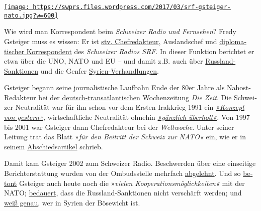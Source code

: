 \href{https://swprs.org/2017/03/01/der-korrespondent/}{\texttt{[image: https://swprs.files.wordpress.com/2017/03/srf-gsteiger-nato.jpg?w=600]}}

Wie wird man Kor­res­pon­dent beim \emph{Schwei­zer Radio und
Fern­sehen}? Fredy Gsteiger muss es wissen: Er ist
\href{http://www.persoenlich.com/medien/fredy-gsteiger-neu-in-der-radio-chefredaktion-232921}{stv.
Chef­redakteur}, Auslands­chef und
\href{http://www.srf.ch/radio-srf-1/radio-srf-1/fredy-gsteiger-unser-mann-in-der-uno}{diplo­ma­tischer
Korres­pon­dent} des \emph{Schwei­zer Radios SRF}. In dieser Funktion
be­richtet er etwa über die UNO, NATO und EU -- und damit z.B. auch über
\href{http://www.srf.ch/news/international/dieser-eu-rueckzieher-ist-peinlich}{Russ­land-Sanktionen}
und die Genfer
\href{http://www.srf.ch/news/international/assad-kommt-mit-giftgaseinsaetzen-vorlaeufig-davon}{Syrien-Ver­hand­lungen}.

Gsteiger begann seine journa­lis­tische Lauf­bahn Ende der 80er Jahre
als Nahost-Redakteur bei der
\href{https://swprs.org/netzwerk-medien-deutschland/}{deutsch-trans­atlan­tischen}
Wochen­zeitung \emph{Die Zeit}. Die Schwei­zer Neutra­lität war für ihn
schon vor dem Ersten Irak­krieg 1991 ein
\emph{\href{http://www.zeit.de/1990/44/ein-konzept-von-gestern}{»Konzept
von gestern«},} wirt­schaft­liche Neutralität ohnehin
\emph{\href{http://www.zeit.de/1990/44/ein-konzept-von-gestern}{»gänz­lich
über­holt«}.} Von 1997 bis 2001 war Gsteiger dann Chef­redakteur bei der
\emph{Welt­woche}. Unter seiner Leitung trat das Blatt »\emph{für den
Bei­tritt der Schweiz zur NATO«} ein, wie er in seinem
\href{https://web.archive.org/web/20040722094101/http://www.weltwoche.ch/artikel/?AssetID=400\&CategoryID=60}{Abschieds­artikel}
schrieb.

Damit kam Gsteiger 2002 zum Schweizer Radio. Be­schwer­den über eine
ein­sei­tige Be­richt­er­stattung wurden von der Ombuds­stelle mehr­fach
\href{https://www.srgd.ch/de/aktuelles/news/2016/09/28/sendung-info-3-auf-radio-srf-3-uber-waffenruhe-syrien-beanstandet/}{abge­lehnt}.
Und so
\href{http://www.swissinfo.ch/ger/kooperation_die-nato-umwirbt-die-schweiz/42225918}{be­tont}
Gsteiger auch heute noch die »\emph{vielen
Koope­ra­tions­möglich­keiten«} mit der NATO;
\href{http://www.srf.ch/news/international/dieser-eu-rueckzieher-ist-peinlich}{be­dauert},
dass die Russ­land-Sanktionen nicht ver­schärft werden; und
\href{http://www.srf.ch/news/international/assad-kommt-mit-giftgaseinsaetzen-vorlaeufig-davon}{weiß
genau}, wer in Syrien der Böse­wicht ist.

